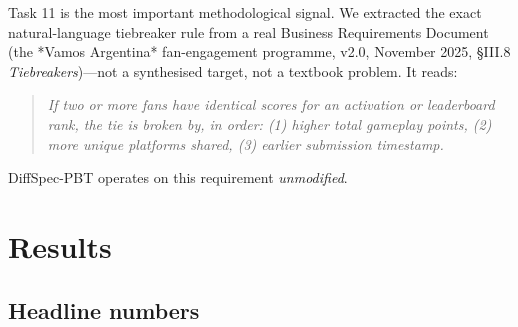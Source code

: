 \documentclass[11pt,a4paper]{article}
\begin{document}
Task 11 is the most important methodological signal. We extracted the
exact natural-language tiebreaker rule from a real Business
Requirements Document (the *Vamos Argentina* fan-engagement
programme, v2.0, November 2025, §III.8 \emph{Tiebreakers})—not a
synthesised target, not a textbook problem. It reads:

\begin{quote}
\itshape
If two or more fans have identical scores for an activation or
leaderboard rank, the tie is broken by, in order: (1) higher total
gameplay points, (2) more unique platforms shared, (3) earlier
submission timestamp.
\end{quote}

DiffSpec-PBT operates on this requirement \emph{unmodified}.

\section{Results}

\subsection{Headline numbers}
\end{document}
